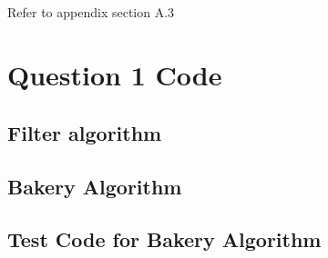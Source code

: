 \documentclass[11pt]{article}
\begin{document}
\subsection{}
Refer to appendix section A.3


\appendix
\section{Question 1 Code}
\subsection{Filter algorithm}

\subsection{Bakery Algorithm}

\subsection{Test Code for Bakery Algorithm}

\end{document}
